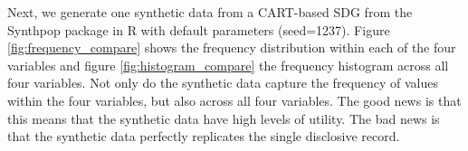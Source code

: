 \documentclass[runningheads]{llncs}
\begin{document}

Next, we generate one synthetic data from a CART-based SDG from the Synthpop package in R with default parameters (seed=1237).  Figure \ref{fig:frequency_compare} shows the frequency distribution within each of the four variables and figure \ref{fig:histogram_compare} the frequency histogram across all four variables.  Not only do the synthetic data capture the frequency of values within the four variables, but also across all four variables.  The good news is that this means that the synthetic data have high levels of utility.  The bad news is that the synthetic data perfectly replicates the single disclosive record.
\end{document}

